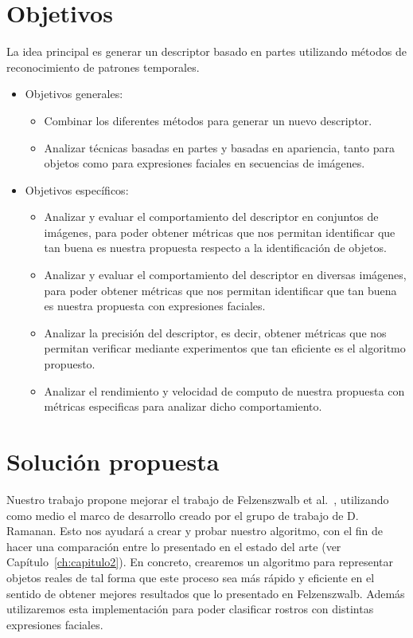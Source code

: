 \section{Objetivos}
La idea principal es generar un descriptor basado en partes utilizando métodos de reconocimiento de patrones temporales.
\begin{itemize}
		\item Objetivos generales:
			\begin{itemize}
				\item Combinar los diferentes métodos para generar un nuevo descriptor.
				\item Analizar técnicas basadas en partes y basadas en apariencia, tanto para objetos como para expresiones faciales en secuencias de imágenes.
			\end{itemize}
		\item Objetivos específicos:
			\begin{itemize}
				\item Analizar y evaluar el comportamiento del descriptor en conjuntos de imágenes, para poder obtener métricas que nos permitan identificar que tan buena es nuestra propuesta respecto a la identificación de objetos.
				\item Analizar y evaluar el comportamiento del descriptor en diversas imágenes, para poder obtener métricas que nos permitan identificar que tan buena es nuestra propuesta con expresiones faciales.
				\item Analizar la precisión del descriptor, es decir, obtener métricas que nos permitan verificar mediante experimentos que tan eficiente es el algoritmo propuesto.
				\item Analizar el rendimiento y velocidad de computo de nuestra propuesta con métricas especificas para analizar dicho comportamiento.
				
			\end{itemize}			

	\end{itemize}

\section{Solución propuesta}

Nuestro trabajo propone mejorar el trabajo de Felzenszwalb et al.~\cite{Felzenszwalb2008,Felzenszwalb2010,Felzenszwalb2013}, utilizando como medio el marco de desarrollo creado por el grupo de trabajo de D. Ramanan. Esto nos ayudará a crear y probar nuestro algoritmo, con el fin de hacer una comparación entre lo presentado en el estado del arte (ver Capítulo~\ref{ch:capitulo2}). En concreto, crearemos un algoritmo para representar objetos reales de tal forma que este proceso sea más rápido y eficiente en el sentido de obtener mejores resultados que lo presentado en Felzenszwalb. Además utilizaremos esta implementación para poder clasificar rostros con distintas expresiones faciales.

